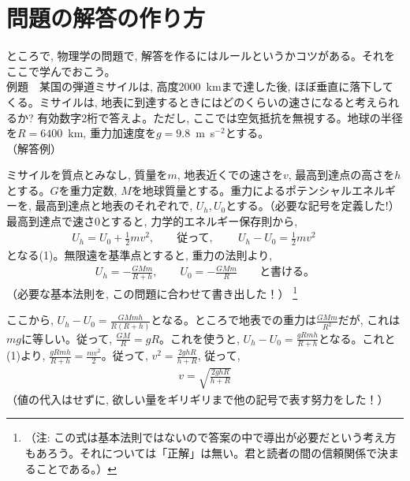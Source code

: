 \section{問題の解答の作り方}

ところで, 物理学の問題で, 解答を作るにはルールというかコツがある。それをここで学んでおこう。\\

例題　某国の弾道ミサイルは, 高度2000~kmまで達した後, ほぼ垂直に落下してくる。ミサイルは, 地表に到達するときにはどのくらいの速さになると考えられるか? 有効数字2桁で答えよ。ただし, ここでは空気抵抗を無視する。地球の半径を$R=6400$~km, 重力加速度を$g=9.8$~m~s$^{-2}$とする。\\

（解答例）

ミサイルを質点とみなし, 質量を$m$, 地表近くでの速さを$v$, 最高到達点の高さを$h$とする。$G$を重力定数, $M$を地球質量とする。重力によるポテンシャルエネルギーを, 最高到達点と地表のそれぞれで, $U_h, U_0$とする。{\small （必要な記号を定義した!）}\\

最高到達点で速さ0とすると, 力学的エネルギー保存則から, 
\begin{eqnarray*}
U_h=U_0+\frac{1}{2}mv^2, \quad\quad\text{従って, }\quad\quad U_h-U_0=\frac{1}{2}mv^2\quad\quad\end{eqnarray*}
となる(1)。無限遠を基準点とすると, 重力の法則より, 
\begin{eqnarray*}
U_h=-\frac{GMm}{R+h},\quad\quad U_0=-\frac{GMm}{R}\quad\quad\text{と書ける。}
\end{eqnarray*}
{\small（必要な基本法則を, この問題に合わせて書き出した！）}
\footnote{（注: この式は基本法則ではないので答案の中で導出が必要だという考え方もあろう。それについては「正解」は無い。君と読者の間の信頼関係で決まることである。）}

ここから, $U_h-U_0=\frac{GMmh}{R(R+h)}$となる。ところで地表での重力は$\frac{GMm}{R^2}$だが, これは$mg$に等しい。従って, $\frac{GM}{R}=gR$。これを使うと, $U_h-U_0=\frac{gRmh}{R+h}$となる。これと(1)より, $\frac{gRmh}{R+h}=\frac{mv^2}{2}$。従って, $v^2=\frac{2ghR}{h+R}$, 従って, 
\begin{eqnarray*}
v=\sqrt{\frac{2ghR}{h+R}}
\end{eqnarray*}
{\small（値の代入はせずに, 欲しい量をギリギリまで他の記号で表す努力をした！）}

